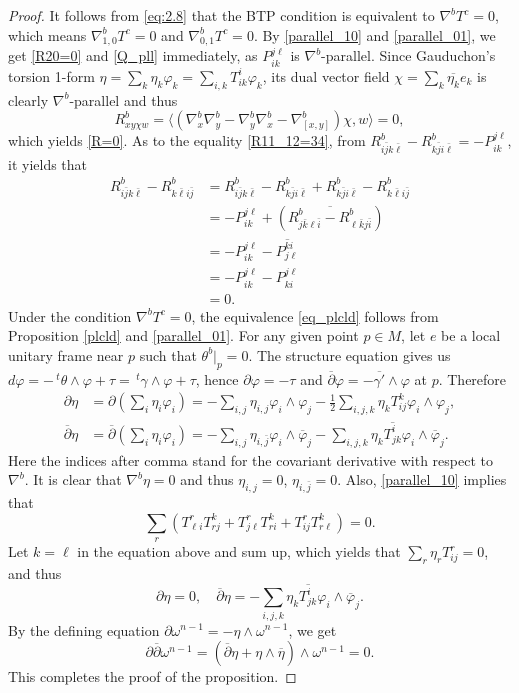 \documentclass{amsart}
\numberwithin{equation}{section}
\theoremstyle{definition}
\renewcommand{\1}{\mathds{1}}
\renewcommand{\>}{\rightarrow}
\begin{document}
\begin{proof}
It follows from \eqref{eq:2.8} that the BTP condition is equivalent to $\nabla^b T^c=0$, which means $\nabla^b_{1,0} T^c=0$ and $\nabla^b_{0,1} T^c=0$. By \eqref{parallel_10} and \eqref{parallel_01}, we get \eqref{R20=0} and \eqref{Q_pll} immediately, as $P_{ik}^{j\ell}$ is $\nabla^b$-parallel. Since Gauduchon's torsion 1-form $\eta=\sum_k \eta_k \varphi_k = \sum_{i,k}T^i_{ik}\varphi_k$, its dual vector field $\chi=\sum_k \overline{\eta_k} e_k$ is clearly $\nabla^b$-parallel and thus
\[R^b_{xy\chi w} = \langle (\nabla^b_x\nabla^b_y-\nabla^b_y\nabla^b_x-\nabla^b_{[x,y]})\chi,w\rangle =0,\]
which yields \eqref{R=0}. As to the equality \eqref{R11_12=34}, from $R^b_{i \bar{j} k \bar{\ell}} - R^b_{k \bar{j} i \bar{\ell}} = -P_{ik}^{j \ell}$, it yields that
\[\begin{aligned}
R^b_{i \bar{j} k \bar{\ell}} - R^b_{k \bar{\ell} i \bar{j}} &=  R^b_{i \bar{j} k \bar{\ell}} - R^b_{k \bar{j} i \bar{\ell}} + R^b_{k \bar{j} i \bar{\ell}} - R^b_{k \bar{\ell} i \bar{j}} \\
&= -P_{ik}^{j \ell} + (\overline{R^b_{j \bar{k} \ell \bar{i}} - R^b_{\ell \bar{k} j \bar{i}}})\\
&= -P_{ik}^{j \ell} - \overline{P_{j \ell}^{k i}}\\
&= -P_{ik}^{j \ell} -P_{ki}^{j \ell} \\
&=0.
\end{aligned}\]
Under the condition $\nabla^bT^c=0$, the equivalence \eqref{eq_plcld} follows from Proposition \ref{plcld} and \eqref{parallel_01}. For any given point $p\in M$, let $e$ be a local unitary frame near $p$ such that $\theta^b|_p=0$. The structure equation gives us $d\varphi = - \,^t\!\theta \wedge \varphi + \tau =  \,^t\!\gamma \wedge \varphi + \tau$, hence $\partial \varphi = -\tau$ and $\overline{\partial} \varphi = -\overline{\gamma'}\wedge \varphi$ at $p$. Therefore
\[\begin{aligned}
\partial \eta &= \partial (\sum_i \eta_i \varphi_i)
= -\sum_{i,j}\eta_{i,j}\varphi_i \wedge \varphi_j - \frac{1}{2} \sum_{i,j,k} \eta_k T^k_{ij} \varphi_i \wedge \varphi_j,\\
\overline{\partial} \eta &=\overline{\partial} (\sum_i \eta_i \varphi_i)
= - \sum_{i,j} \eta_{i,\bar{j}} \varphi_i \wedge \overline{\varphi}_j -  \sum_{i,j,k} \eta_k \overline{T^i_{jk}} \varphi_i \wedge \overline{\varphi}_j.
\end{aligned}\]
Here the indices after comma stand for the covariant derivative with respect to $\nabla^{b}$. It is clear that $\nabla^b \eta=0$ and thus $\eta_{i,j}=0$, $\eta_{i,\bar{j}}=0$. Also, \eqref{parallel_10} implies that
\[  \sum_r(T^r_{\ell i}T^k_{r j} + T^r_{j\ell}T^k_{ri} + T^r_{ij}T^k_{r \ell})=0. \]
Let $k=\ell$ in the equation above and sum up, which yields that $\sum_r\eta_r T^r_{ij}=0$, and thus
\[\partial \eta=0,\quad \overline{\partial} \eta = -\sum_{i,j,k}\eta_k \overline{T^i_{jk}} \varphi_i \wedge \overline{\varphi}_j.\]
By the defining equation $\partial \omega^{n-1} = - \eta \wedge \omega^{n-1}$, we get
\[  \partial \overline{\partial} \omega^{n-1} =  (\overline{\partial} \eta
+  \eta \wedge \overline{\eta}) \wedge \omega^{n-1} = 0.\]
This completes the proof of the proposition.
\end{proof}
\end{document}
